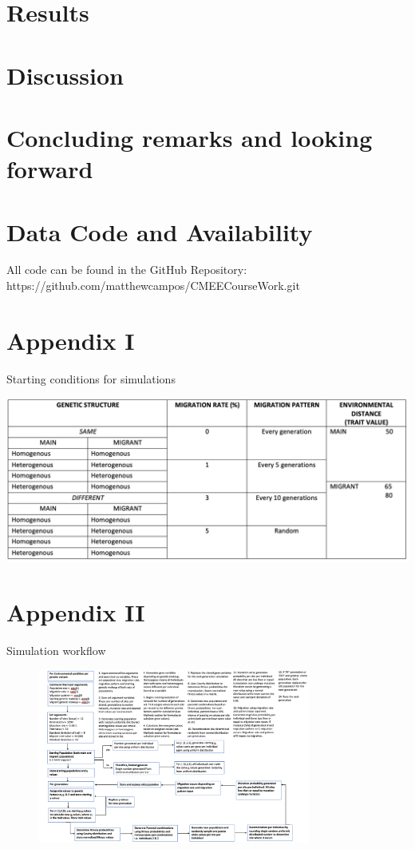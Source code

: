 \documentclass[11pt]{article}
\begin{document}
\section{Results}


\section{Discussion}


\section{Concluding remarks and looking forward}


\newpage

\section{Data Code and Availability}
All code can be found in the GitHub Repository:\\
{https://github.com/matthewcampos/CMEECourseWork.git}

\newpage




\newpage

\section{Appendix I}
Starting conditions for simulations
\begin{table}[h]
\centering
\includegraphics[scale=0.80]{../Results/AppendixI_conditions.jpg}
\end{table}

\section{Appendix II}
Simulation workflow
\begin{figure}[h]
\centering
    \includegraphics[width=0.8\textwidth]{../Results/workflow.jpg}
\end{figure}
\end{document}
